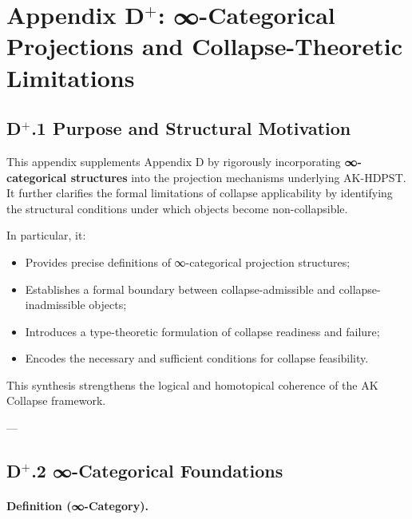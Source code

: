\documentclass[11pt]{article}
\begin{document}

\section*{Appendix D$^{+}$: ∞-Categorical Projections and Collapse-Theoretic Limitations}

\subsection*{D$^{+}$.1 Purpose and Structural Motivation}

This appendix supplements Appendix D by rigorously incorporating \textbf{∞-categorical structures} into the projection mechanisms underlying AK-HDPST. It further clarifies the formal limitations of collapse applicability by identifying the structural conditions under which objects become non-collapsible.

In particular, it:

\begin{itemize}
    \item Provides precise definitions of ∞-categorical projection structures;
    \item Establishes a formal boundary between collapse-admissible and collapse-inadmissible objects;
    \item Introduces a type-theoretic formulation of collapse readiness and failure;
    \item Encodes the necessary and sufficient conditions for collapse feasibility.
\end{itemize}

This synthesis strengthens the logical and homotopical coherence of the AK Collapse framework.

---

\subsection*{D$^{+}$.2 ∞-Categorical Foundations}

\paragraph{Definition (∞-Category).}
\end{document}
